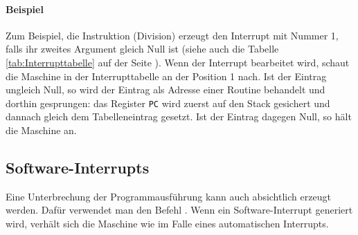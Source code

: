 \paragraph{Beispiel}
Zum Beispiel, die  Instruktion (Division) erzeugt den Interrupt mit
Nummer 1, falls ihr zweites Argument gleich Null ist (siehe auch die Tabelle
\ref{tab:Interrupttabelle} auf der Seite \pageref{tab:Interrupttabelle}). Wenn
der Interrupt bearbeitet wird, schaut die Maschine in der Interrupttabelle an
der Position 1 nach. Ist der Eintrag ungleich Null, so wird der Eintrag als
Adresse einer Routine behandelt und dorthin gesprungen: das Register \texttt{PC}
wird zuerst auf den Stack gesichert und dannach gleich dem Tabelleneintrag
gesetzt. Ist der Eintrag dagegen Null, so hält die Maschine an.



\subsection{Software-Interrupts}

Eine Unterbrechung der Programmausführung kann auch absichtlich erzeugt werden.
Dafür verwendet man den Befehl . Wenn ein Software-Interrupt
generiert wird, verhält sich die Maschine wie im Falle eines automatischen
Interrupts.










